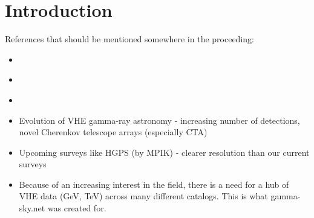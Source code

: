 \section{Introduction}

References that should be mentioned somewhere in the proceeding:

\begin{itemize}
    \item \cite{2015arXiv150907408D}
    \item \cite{2016arXiv160600393K}
    \item \cite{tevcat}
\end{itemize}

\begin{itemize}

\item Evolution of VHE gamma-ray astronomy - increasing number of detections, novel Cherenkov telescope arrays (especially CTA)

\item Upcoming surveys like HGPS (by MPIK) - clearer resolution than our current surveys

\item Because of an increasing interest in the field, there is a need for a hub of VHE data (GeV, TeV) across many different catalogs.
This is what gamma-sky.net was created for.

\end{itemize}
